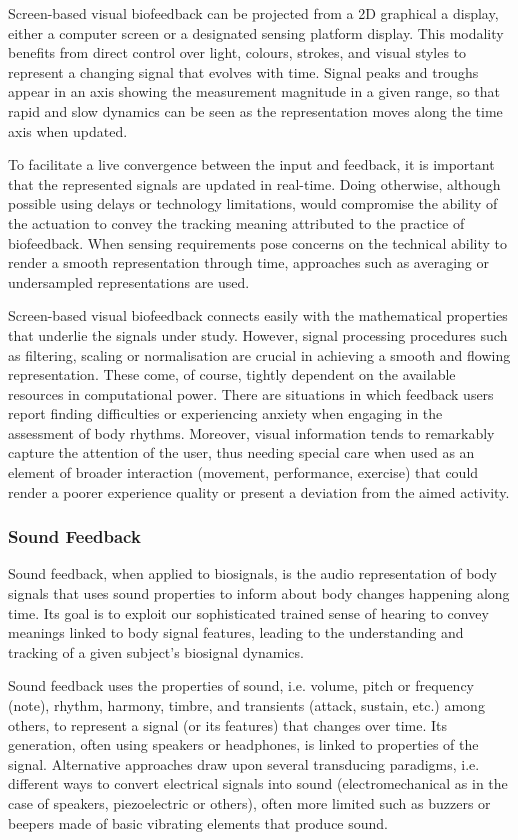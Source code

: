 Screen-based visual biofeedback can be projected from a 2D graphical a display, either a computer screen or a designated sensing platform display. This modality benefits from direct control over light, colours, strokes, and visual styles to represent a changing signal that evolves with time. Signal peaks and troughs appear in an axis showing the measurement magnitude in a given range, so that rapid and slow dynamics can be seen as the representation moves along the time axis when updated.

To facilitate a live convergence between the input and feedback, it is important that the represented signals are updated in real-time. Doing otherwise, although possible using delays or technology limitations, would compromise the ability of the actuation to convey the tracking meaning attributed to the practice of biofeedback. When sensing requirements pose concerns on the technical ability to render a smooth representation through time, approaches such as averaging or undersampled representations are used.

Screen-based visual biofeedback connects easily with the mathematical properties that underlie the signals under study. However, signal processing procedures such as filtering, scaling or normalisation are crucial in achieving a smooth and flowing representation. These come, of course, tightly dependent on the available resources in computational power.
There are situations in which feedback users report finding difficulties or experiencing anxiety when engaging in the assessment of body rhythms. Moreover, visual information tends to remarkably capture the attention of the user, thus needing special care when used as an element of broader interaction (movement, performance, exercise) that could render a poorer experience quality or present a deviation from the aimed activity.

\subsubsection{Sound Feedback}

Sound feedback, when applied to biosignals, is the audio representation of body signals that uses sound properties to inform about body changes happening along time. Its goal is to exploit our sophisticated trained sense of hearing to convey meanings linked to body signal features, leading to the understanding and tracking of a given subject’s biosignal dynamics.

Sound feedback uses the properties of sound, i.e. volume, pitch or frequency (note), rhythm, harmony, timbre, and transients (attack, sustain, etc.) among others, to represent a signal (or its features) that changes over time. Its generation, often using speakers or headphones, is linked to properties of the signal. Alternative approaches draw upon several transducing paradigms, i.e. different ways to convert electrical signals into sound (electromechanical as in the case of speakers, piezoelectric or others), often more limited such as buzzers or beepers made of basic vibrating elements that produce sound.

